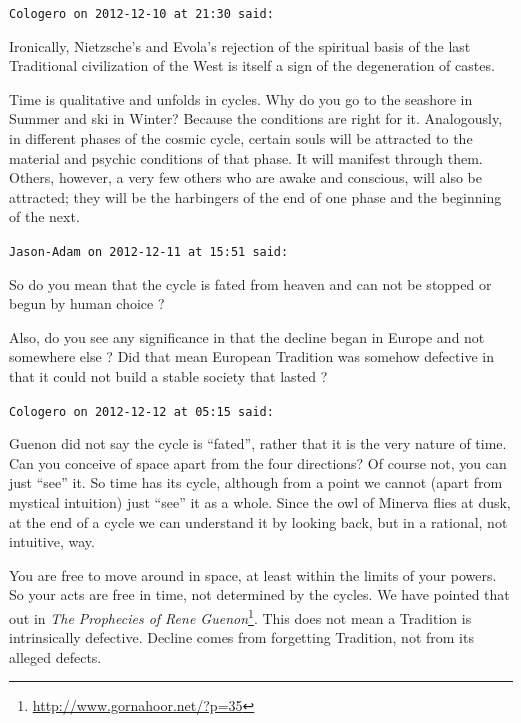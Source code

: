 \begin{footnotesize}
\begin{sffamily}
\hfill

\texttt{Cologero on 2012-12-10 at 21:30 said:}

Ironically, Nietzsche's and Evola's rejection of the spiritual basis of the last Traditional civilization of the West is itself a sign of the degeneration of castes.

Time is qualitative and unfolds in cycles. Why do you go to the seashore in Summer and ski in Winter? Because the conditions are right for it. Analogously, in different phases of the cosmic cycle, certain souls will be attracted to the material and psychic conditions of that phase. It will manifest through them. Others, however, a very few others who are awake and conscious, will also be attracted; they will be the harbingers of the end of one phase and the beginning of the next.

\hfill

\texttt{Jason-Adam on 2012-12-11 at 15:51 said:}

So do you mean that the cycle is fated from heaven and can not be stopped or begun by human choice ?

Also, do you see any significance in that the decline began in Europe and not somewhere else ? Did that mean European Tradition was somehow defective in that it could not build a stable society that lasted ?

\hfill

\texttt{Cologero on 2012-12-12 at 05:15 said:}

Guenon did not say the cycle is ``fated'', rather that it is the very nature of time. Can you conceive of space apart from the four directions? Of course not, you can just ``see'' it. So time has its cycle, although from a point we cannot (apart from mystical intuition) just ``see'' it as a whole. Since the owl of Minerva flies at dusk, at the end of a cycle we can understand it by looking back, but in a rational, not intuitive, way.

You are free to move around in space, at least within the limits of your powers. So your acts are free in time, not determined by the cycles. We have pointed that out in \textit{The Prophecies of Rene Guenon}\footnote{\url{http://www.gornahoor.net/?p=35}}. This does not mean a Tradition is intrinsically defective. Decline comes from forgetting Tradition, not from its alleged defects.


\hfill

\end{sffamily}
\end{footnotesize}

